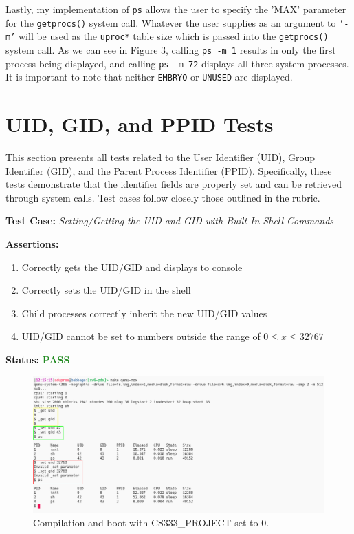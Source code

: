 \documentclass[11pt,letterpaper]{report}
\newcommand{\code}[1]{\colorbox{codegray}{\texttt{#1}}}
\begin{document}
{  Lastly, my implementation of \code{ps} allows the user to specify the 'MAX' parameter
  for the \code{getprocs()} system call. Whatever the user supplies as an argument to
  \code{'-m'} will be used as the \code{uproc*} table size which is passed into the
  \code{getprocs()} system call. As we can see in Figure 3, calling \code{ps -m 1} results
  in only the first process being displayed, and calling \code{ps -m 72} displays all three
  system processes. It is important to note that neither \code{EMBRYO} or \code{UNUSED}
  are displayed. 

  \pagebreak

  \section*{UID, GID, and PPID Tests}
  This section presents all tests related to the User Identifier (UID), Group Identifier (GID),
  and the Parent Process Identifier (PPID). Specifically, these tests demonstrate that the
  identifier fields are properly set and can be retrieved through system calls. 
  Test cases follow closely those outlined in the rubric. \hfill \break
  
  \noindent\textbf{Test Case:} \emph{Setting/Getting the UID and GID with Built-In Shell Commands}
  
  \noindent\textbf{Assertions:}
  \begin{enumerate}[]
  \item Correctly gets the UID/GID and displays to console
  \item Correctly sets the UID/GID in the shell
  \item Child processes correctly inherit the new UID/GID values
  \item UID/GID cannot be set to numbers outside the range of $0 \leq x \leq 32767$
  \end{enumerate}  
  
  \noindent\textbf{Status:} \textcolor{ForestGreen}{\textbf{PASS}}
  
  \begin{figure}[h!]
	\centering
	\includegraphics[width=1\linewidth]{built-in-cmds.png}
	\caption[img]{Compilation and boot with CS333\_PROJECT set to 0.}
	\label{fig:P1compileP0-1}
  \end{figure}

}
\end{document}
